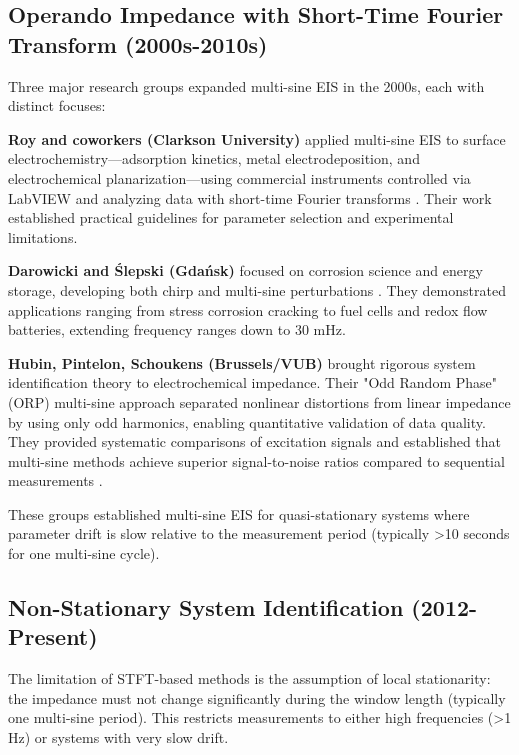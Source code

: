 \subsection{Operando Impedance with Short-Time Fourier Transform (2000s-2010s)}

Three major research groups expanded multi-sine EIS in the 2000s, each with distinct focuses:

\textbf{Roy and coworkers (Clarkson University)} applied multi-sine EIS to surface electrochemistry—adsorption kinetics, metal electrodeposition, and electrochemical planarization—using commercial instruments controlled via LabVIEW and analyzing data with short-time Fourier transforms \cite{waltersWeakAdsorptionAnions2001a, garlandAnalysisExperimentalConstraints2004}. Their work established practical guidelines for parameter selection and experimental limitations.

\textbf{Darowicki and Ślepski (Gdańsk)} focused on corrosion science and energy storage, developing both chirp and multi-sine perturbations \cite{darowickiDynamicElectrochemicalImpedance2003a, darowickiInstantaneousElectrochemicalImpedance2004a}. They demonstrated applications ranging from stress corrosion cracking to fuel cells and redox flow batteries, extending frequency ranges down to 30 mHz.

\textbf{Hubin, Pintelon, Schoukens (Brussels/VUB)} brought rigorous system identification theory to electrochemical impedance. Their "Odd Random Phase" (ORP) multi-sine approach \cite{vaningelgemAdvantagesOddRandom2009} separated nonlinear distortions from linear impedance by using only odd harmonics, enabling quantitative validation of data quality. They provided systematic comparisons of excitation signals \cite{schoukensSurveyExcitationSignals1988a} and established that multi-sine methods achieve superior signal-to-noise ratios compared to sequential measurements \cite{schoukensBroadbandSteppedSine1999}.

These groups established multi-sine EIS for quasi-stationary systems where parameter drift is slow relative to the measurement period (typically >10 seconds for one multi-sine cycle).

\subsection{Non-Stationary System Identification (2012-Present)}

The limitation of STFT-based methods is the assumption of local stationarity: the impedance must not change significantly during the window length (typically one multi-sine period). This restricts measurements to either high frequencies (>1 Hz) or systems with very slow drift.

